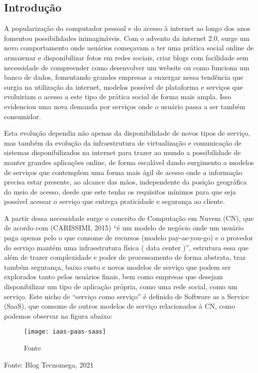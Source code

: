 
\begin{justify}
    \section{Introdução}
    A popularização do computador pessoal e do acesso à internet ao longo dos anos fomentou possibilidades inimagináveis. Com o advento da
    internet 2.0, surge um novo comportamento onde usuários começavam a ter uma prática social online de armazenar e disponibilizar fotos em
    redes sociais, criar blogs com facilidade sem necessidade de compreender como desenvolver um website ou como funciona um banco de dados,
    fomentando grandes empresas a enxergar nessa tendência que surgia na utilização da internet, modelos possível de plataforma e serviços que
    evoluiríam o acesso a este tipo de prática social de forma mais ampla. Isso evidenciou uma nova demanda por serviços onde o usuário passa a
    ser também consumidor.

    Esta evolução dependia não apenas da disponibilidade de novos tipos de serviço, mas também da evolução da infraestrutura de virtualização e
    comunicação de sistemas disponibilizados na internet para trazer ao mundo a possibilidade de manter grandes aplicações online, de forma
    escalável dando surgimento a modelos de serviços que contemplem uma forma mais ágil de acesso onde a informação precisa estar presente, ao
    alcance das mãos, independente da posição geográfica do meio de acesso, desde que este tenha os requisitos mínimos para que seja possível
    acessar o serviço que entrega praticidade e segurança ao cliente. 

    A partir dessa necessidade surge o conceito de Computação em Nuvem (CN), que de acordo com (CARISSIMI, 2015) “é um modelo de negócio
    onde um usuário paga apenas pelo o que consome de recursos (modelo pay-as-you-go) e o provedor do serviço mantém uma infraestrutura física
    ( data center )”, estrutura essa que além de trazer complexidade e poder de processamento de forma abstrata, traz também segurança, baixo
    custo e novos modelos de serviço que podem ser explorados tanto pelos usuários finais, bem como empresas que desejam disponibilizar um tipo
    de aplicação própria, como uma rede social, como um serviço. 
    Este nicho de “serviço como serviço” é definido de Software as a Service (SaaS), que consome de outros modelos de serviço relacionados à CN,
    como podemos observar na figura abaixo:
        
    \begin{Center}
    \begin{figure}[h]
        \centering
        \caption{Fonte}
        \texttt{[image: iaas-paas-saas]}
        \label{fig:iaas-paas-saas}
    \end{figure}
    \footnotesize{Fonte: Blog Tecnomega, 2021}
    \end{Center}

\end{justify}

